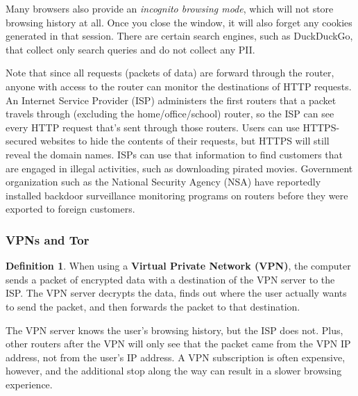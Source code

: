 \documentclass[a4paper, 12pt]{report}
\theoremstyle{remark}
\theoremstyle{definition}
\newtheorem{definition}{Definition}[section]
\begin{document}
Many browsers also provide an \textit{incognito browsing mode}, which will not store browsing history at all. Once you close the window, it will also forget any cookies generated in that session. There are certain search engines, such as DuckDuckGo, that collect only search queries and do not collect any PII.

Note that since all requests (packets of data) are forward through the router, anyone with access to the router can monitor the destinations of HTTP requests. An Internet Service Provider (ISP) administers the first routers that a packet travels through (excluding the home/office/school) router, so the ISP can see every HTTP request that's sent through those routers. Users can use HTTPS-secured websites to hide the contents of their requests, but HTTPS will still reveal the domain names. ISPs can use that information to find customers that are engaged in illegal activities, such as downloading pirated movies. Government organization such as the National Security Agency (NSA) have reportedly installed backdoor surveillance monitoring programs on routers before they were exported to foreign customers. 

\subsubsection{VPNs and Tor}
\begin{definition}
When using a \textbf{Virtual Private Network (VPN)}, the computer sends a packet of encrypted data with a destination of the VPN server to the ISP. The VPN server decrypts the data, finds out where the user actually wants to send the packet, and then forwards the packet to that destination. 
\begin{center}
\end{center}
The VPN server knows the user's browsing history, but the ISP does not. Plus, other routers after the VPN will only see that the packet came from the VPN IP address, not from the user's IP address. A VPN subscription is often expensive, however, and the additional stop along the way can result in a slower browsing experience. 
\end{definition}
\end{document}
